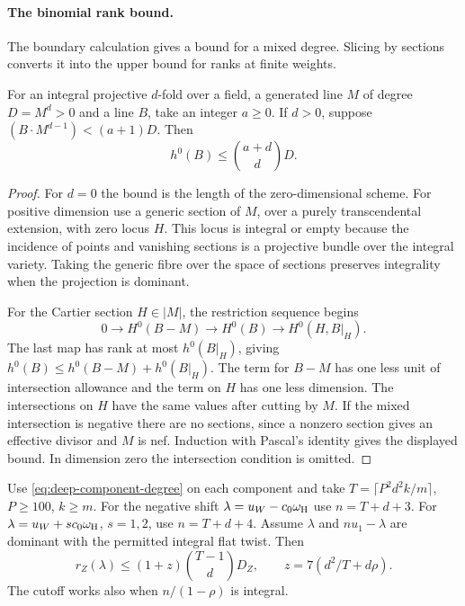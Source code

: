 \paragraph{The binomial rank bound.}

The boundary calculation gives a bound for a mixed degree. Slicing by sections converts it into the upper bound for ranks at finite weights.

\begin{lemma}\label{lem:binomial-section-rank}
For an integral projective \(d\)-fold over a field, a
generated line \(M\) of degree \(D=M^d>0\) and a line
\(B\), take an integer \(a\ge0\). If \(d>0\), suppose
\((B\cdot M^{d-1})<(a+1)D\). Then
\[
 h^0(B)\le\binom{a+d}{d}D .
\]
\end{lemma}

\begin{proof}
For \(d=0\) the bound is the length of the zero-dimensional
scheme. For positive dimension use a generic section of
\(M\), over a purely transcendental extension, with zero
locus \(H\). This locus is integral or empty because the
incidence of points and vanishing sections is a projective
bundle over the integral variety. Taking the generic fibre
over the space of sections preserves integrality when the
projection is dominant.

For the Cartier section \(H\in|M|\), the restriction sequence begins
\[
 0\longrightarrow H^0(B-M)\longrightarrow H^0(B)
 \longrightarrow H^0(H,B|_H).
\]
The last map has rank at most \(h^0(B|_H)\), giving
\(h^0(B)\le h^0(B-M)+h^0(B|_H)\).
The term for \(B-M\) has one less unit of intersection
allowance and the term on \(H\) has one less dimension.
The intersections on \(H\) have the same values after
cutting by \(M\). If the mixed intersection is negative
there are no sections, since a nonzero section gives an
effective divisor and \(M\) is nef. Induction with Pascal's
identity gives the displayed bound. In dimension zero
the intersection condition is omitted.

\end{proof}

\begin{proposition}\label{prop:deep-shifted-rank-upper}
Use \eqref{eq:deep-component-degree} on each component and take
\(T=\lceil P^2d^2k/m\rceil\), \(P\ge100\), \(k\ge m\).
For the negative shift \(\lambda=u_W-c_0\omega_{\rm H}\) use
\(n=T+d+3\). For \(\lambda=u_W+s c_0\omega_{\rm H}\), \(s=1,2\),
use \(n=T+d+4\). Assume \(\lambda\) and \(nu_1-\lambda\)
are dominant with the permitted integral flat twist.
Then
\[
 r_Z(\lambda)\le(1+z)\binom{T-1}{d}D_Z,\qquad z=7(d^2/T+d\rho).
\]
 The cutoff works also when
\(n/(1-\rho)\) is integral.
\end{proposition}

